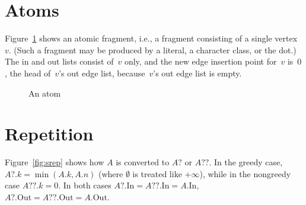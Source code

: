 \documentclass{article}
\newcommand*{\In}{\mathrm{In}}
\newcommand*{\Out}{\mathrm{Out}}
\begin{document}
\section{Atoms}

Figure~\ref{fig:atom} shows an atomic fragment, i.e., a fragment consisting of a single vertex~$v$. (Such a fragment may be produced by a literal, a character class, or the dot.) The in and out lists consist of~$v$ only, and the new edge insertion point for~$v$ is~$0$, the head of~$v$'s out edge list, because~$v$'s out edge list is empty.

\begin{figure}
\centering
{}
\caption{An atom\label{fig:atom}}
\end{figure}

\section{Repetition}

Figure~\ref{fig:srep} shows how $A$ is converted to $A?$ or $A??$. In the greedy case, $A?.k = \min(A.k,A.n)$ (where $\emptyset$ is treated like $+\infty$), while in the nongreedy case $A??.k = 0$. In both cases $A?.\In = A??.\In = A.\In$, $A?.\Out = A??.\Out = A.\Out$.
\end{document}
